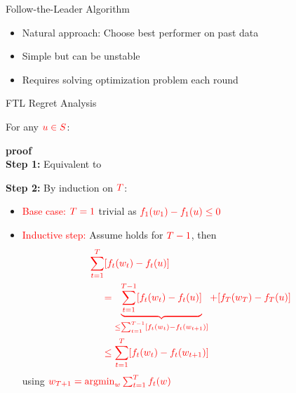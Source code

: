\documentclass[handout]{beamer}
\begin{document}
\begin{small}
\begin{frame}{Follow-the-Leader Algorithm}
\begin{itemize}
\item Natural approach: Choose best performer on past data
\item Simple but can be unstable
\item Requires solving optimization problem each round
\end{itemize}
\end{frame}

\begin{frame}{FTL Regret Analysis}
\begin{theorem}[Lemma 2.1]
  For any $\textcolor{red}{u \in S}$:
  \R{\[
    \text{Regret}_T(\mathbf{u}) = \sum_{t=1}^{T} \left(f_t(\mathbf{w}_t) - f_t(\mathbf{u})\right) \leq \sum_{t=1}^{T} \left(f_t(\mathbf{w}_t) - f_t(\mathbf{w}_{t+1})\right).
  \]}
\end{theorem}
{\bf proof} \\
{\bf Step 1:} Equivalent to
\end{frame}

\begin{frame}

{\bf Step 2:} By induction on $\textcolor{red}{T}$:
\begin{itemize}
\item \textcolor{red}{Base case:} $\textcolor{red}{T=1}$ trivial as $\textcolor{red}{f_1(w_1) - f_1(u) \leq 0}$

\item \textcolor{red}{Inductive step:} Assume holds for $\textcolor{red}{T-1}$, then
\begin{align*}
\textcolor{red}{\sum_{t=1}^T} &\textcolor{red}{[f_t(w_t) - f_t(u)]} \\
&\textcolor{red}{= \underbrace{\sum_{t=1}^{T-1} [f_t(w_t) - f_t(u)]}_{\leq \sum_{t=1}^{T-1} [f_t(w_t) - f_t(w_{t+1})]} + [f_T(w_T) - f_T(u)]} \\
&\textcolor{red}{\leq \sum_{t=1}^T [f_t(w_t) - f_t(w_{t+1})]}
\end{align*}
using $\textcolor{red}{w_{T+1} = \operatorname{argmin}_w \sum_{t=1}^T f_t(w)}$
\end{itemize}
\end{frame}


\end{small}
\end{document}

